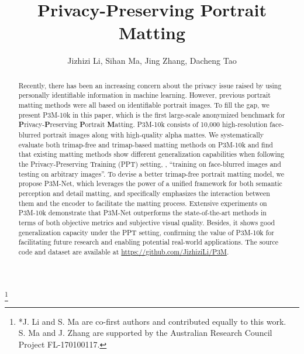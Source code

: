 \documentclass[sigconf]{acmart}
\begin{document}


\title{Privacy-Preserving Portrait Matting}

\author{Jizhizi Li, Sihan Ma, Jing Zhang, Dacheng Tao}
\thanks{*J. Li and S. Ma are co-first authors and contributed equally to this work.\\S. Ma and J. Zhang are supported by the Australian Research Council Project FL-170100117.}



\renewcommand{\shortauthors}{Li and Ma, et al.}

\setlength{\abovecaptionskip}{1pt}
\setlength{\belowcaptionskip}{1pt}
\setlength{\intextsep}{1pt}
\setlength{\textfloatsep}{2pt}

\begin{abstract}
Recently, there has been an increasing concern about the privacy issue raised by using personally identifiable information in machine learning. However, previous portrait matting methods were all based on identifiable portrait images. To fill the gap, we present P3M-10k in this paper, which is the first large-scale anonymized benchmark for \textbf{P}rivacy-\textbf{P}reserving \textbf{P}ortrait \textbf{M}atting. P3M-10k consists of 10,000 high-resolution face-blurred portrait images along with high-quality alpha mattes. We systematically evaluate both trimap-free and trimap-based matting methods on P3M-10k and find that existing matting methods show different generalization capabilities when following the Privacy-Preserving Training (PPT) setting, , ``training on face-blurred images and testing on arbitrary images''. To devise a better trimap-free portrait matting model, we propose P3M-Net, which leverages the power of a unified framework for both semantic perception and detail matting, and specifically emphasizes the interaction between them and the encoder to facilitate the matting process. Extensive experiments on P3M-10k demonstrate that P3M-Net outperforms the state-of-the-art methods in terms of both objective metrics and subjective visual quality. Besides, it shows good generalization capacity under the PPT setting, confirming the value of P3M-10k for facilitating future research and enabling potential real-world applications. The source code and dataset are available at \href{https://github.com/JizhiziLi/P3M}{https://github.com/JizhiziLi/P3M}.
\end{abstract}
\end{document}
